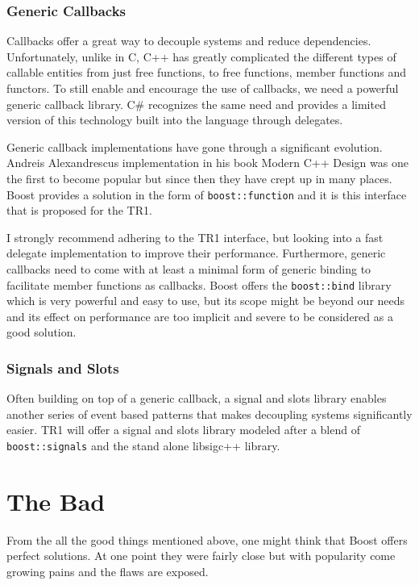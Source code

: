 \documentclass[twocolumn]{paper}
\begin{document}
\subsubsection{Generic Callbacks}

Callbacks offer a great way to decouple systems and reduce
dependencies. Unfortunately, unlike in C, C++ has greatly
complicated the different types of callable entities from just free
functions, to free functions, member functions and functors. To
still enable and encourage the use of callbacks, we need a powerful
generic callback library. C\# recognizes the same need and provides
a limited version of this technology built into the language through
delegates.

Generic callback implementations have gone through a significant
evolution. Andreis Alexandrescus implementation in his book Modern
C++ Design was one the first to become popular but since then they
have crept up in many places. Boost provides a solution in the form
of \texttt{boost::function} and it is this interface that is
proposed for the TR1.

I strongly recommend adhering to the TR1 interface, but looking into
a fast delegate implementation to improve their performance.
Furthermore, generic callbacks need to come with at least a minimal
form of generic binding to facilitate member functions as callbacks.
Boost offers the \texttt{boost::bind} library which is very powerful
and easy to use, but its scope might be beyond our needs and its
effect on performance are too implicit and severe to be considered
as a good solution.

\subsubsection{Signals and Slots}

Often building on top of a generic callback, a signal and slots
library enables another series of event based patterns that makes
decoupling systems significantly easier. TR1 will offer a signal and
slots library modeled after a blend of \texttt{boost::signals} and
the stand alone libsigc++ \cite{bib:libsigc++} library.

\section{The Bad}

From the all the good things mentioned above, one might think that
Boost offers perfect solutions. At one point they were fairly close
but with popularity come growing pains and the flaws are exposed.
\end{document}
